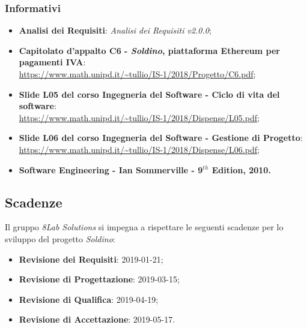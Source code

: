 \subsubsection{Informativi}
\begin{itemize}
	
	\item \textbf{Analisi dei Requisiti}:
	\textit{Analisi dei Requisiti v2.0.0};
	\item \textbf{Capitolato d'appalto C6 - \textit{Soldino}, piattaforma Ethereum per pagamenti IVA}: \\
	\url{https://www.math.unipd.it/~tullio/IS-1/2018/Progetto/C6.pdf};
	\item \textbf{Slide L05 del corso Ingegneria del Software - Ciclo di vita 
		del software}:\\
	\url{https://www.math.unipd.it/~tullio/IS-1/2018/Dispense/L05.pdf};
	\item \textbf{Slide L06 del corso Ingegneria del Software - Gestione di 
	Progetto}: \\
	\url{https://www.math.unipd.it/~tullio/IS-1/2018/Dispense/L06.pdf};
	\item \textbf{Software Engineering - Ian Sommerville - 9$^{th}$ Edition, 
	2010.}
\end{itemize}

\hypertarget{scadenze}{\subsection{Scadenze}}
Il gruppo \textit{8Lab Solutions} si impegna a rispettare le seguenti scadenze per lo 
sviluppo del progetto \textit{Soldino}:

\begin{itemize}
	\item \textbf{Revisione dei Requisiti}: 2019-01-21;
	\item \textbf{Revisione di Progettazione}: 2019-03-15;
	\item \textbf{Revisione di Qualifica}: 2019-04-19;
	\item \textbf{Revisione di Accettazione}: 2019-05-17.
\end{itemize}